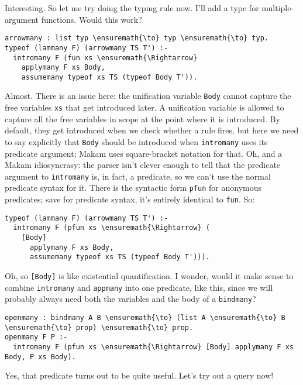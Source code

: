 \heroSTUDENT{} Interesting. So let me try doing the typing rule now. I'll add
a type for multiple-argument functions. Would this work?

\begin{verbatim}
arrowmany : list typ \ensuremath{\to} typ \ensuremath{\to} typ.
typeof (lammany F) (arrowmany TS T') :-
  intromany F (fun xs \ensuremath{\Rightarrow}
    applymany F xs Body,
    assumemany typeof xs TS (typeof Body T')).
\end{verbatim}

\heroADVISOR{} Almost. There is an issue here: the unification variable
\texttt{Body} cannot capture the free variables \texttt{xs} that get
introduced later. A unification variable is allowed to capture all the
free variables in scope at the point where it is introduced. By default,
they get introduced when we check whether a rule fires, but here we need
to say explicitly that \texttt{Body} should be introduced when
\texttt{intromany} uses its predicate argument; Makam uses
square-bracket notation for that. Oh, and a Makam idiosyncrasy: the
parser isn't clever enough to tell that the predicate argument to
\texttt{intromany} is, in fact, a predicate, so we can't use the normal
predicate syntax for it. There is the syntactic form \texttt{pfun} for
anonymous predicates; save for predicate syntax, it's entirely identical
to \texttt{fun}. So:

\begin{verbatim}
typeof (lammany F) (arrowmany TS T') :-
  intromany F (pfun xs \ensuremath{\Rightarrow} (
    [Body]
      applymany F xs Body,
      assumemany typeof xs TS (typeof Body T'))).
\end{verbatim}

\heroSTUDENT{} Oh, so \texttt{{[}Body{]}} is like existential quantification.
I wonder, would it make sense to combine \texttt{intromany} and
\texttt{appmany} into one predicate, like this, since we will probably
always need both the variables and the body of a \texttt{bindmany}?

\begin{verbatim}
openmany : bindmany A B \ensuremath{\to} (list A \ensuremath{\to} B \ensuremath{\to} prop) \ensuremath{\to} prop.
openmany F P :-
  intromany F (pfun xs \ensuremath{\Rightarrow} [Body] applymany F xs Body, P xs Body).
\end{verbatim}

\heroADVISOR{} Yes, that predicate turns out to be quite useful. Let's try out
a query now!

